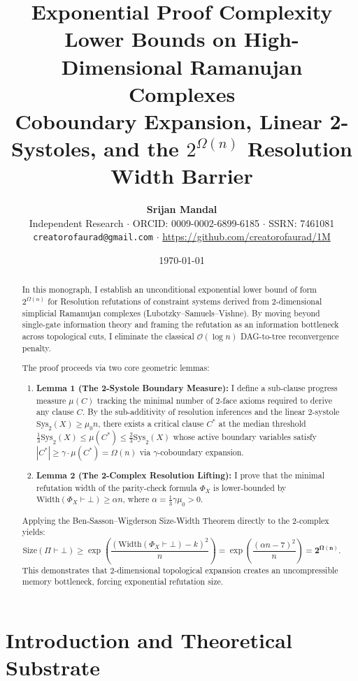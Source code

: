 \documentclass[11pt,a4paper]{article}
\title{\Huge\bfseries\color{primary} Exponential Proof Complexity Lower Bounds on High-Dimensional Ramanujan Complexes\\[0.3em]
\Large Coboundary Expansion, Linear 2-Systoles, and the $2^{\Omega(n)}$ Resolution Width Barrier}
\author{\textbf{Srijan Mandal}\\[0.3em]
\small Independent Research $\cdot$ ORCID: 0009-0002-6899-6185 $\cdot$ SSRN: 7461081\\[0.2em]
\small \texttt{creatorofaurad@gmail.com} $\cdot$ \url{https://github.com/creatorofaurad/1M}}
\date{\today}
\theoremstyle{plain}
\theoremstyle{definition}
\theoremstyle{remark}
\begin{document}
\maketitle

\begin{abstract}
In this monograph, I establish an unconditional exponential lower bound of form $2^{\Omega(n)}$ for Resolution refutations of constraint systems derived from 2-dimensional simplicial Ramanujan complexes (Lubotzky--Samuels--Vishne). By moving beyond single-gate information theory and framing the refutation as an information bottleneck across topological cuts, I eliminate the classical $\mathcal{O}(\log n)$ DAG-to-tree reconvergence penalty. 

The proof proceeds via two core geometric lemmas:
\begin{enumerate}
    \item \textbf{Lemma 1 (The 2-Systole Boundary Measure):} I define a sub-clause progress measure $\mu(C)$ tracking the minimal number of 2-face axioms required to derive any clause $C$. By the sub-additivity of resolution inferences and the linear 2-systole $\mathrm{Sys}_2(X) \ge \mu_0 n$, there exists a critical clause $C^*$ at the median threshold $\frac{1}{3} \mathrm{Sys}_2(X) \le \mu(C^*) \le \frac{2}{3} \mathrm{Sys}_2(X)$ whose active boundary variables satisfy $|C^*| \ge \gamma \cdot \mu(C^*) = \Omega(n)$ via $\gamma$-coboundary expansion.
    \item \textbf{Lemma 2 (The 2-Complex Resolution Lifting):} I prove that the minimal refutation width of the parity-check formula $\Phi_X$ is lower-bounded by $\mathrm{Width}(\Phi_X \vdash \bot) \ge \alpha n$, where $\alpha = \frac{1}{3} \gamma \mu_0 > 0$.
\end{enumerate}
Applying the Ben-Sasson--Wigderson Size-Width Theorem directly to the 2-complex yields:
\[
\mathrm{Size}(\Pi \vdash \bot) \ge \exp\left( \frac{(\mathrm{Width}(\Phi_X \vdash \bot) - k)^2}{n} \right) = \exp\left( \frac{(\alpha n - 7)^2}{n} \right) = \mathbf{2^{\Omega(n)}}.
\]
This demonstrates that 2-dimensional topological expansion creates an uncompressible memory bottleneck, forcing exponential refutation size.
\end{abstract}

\tableofcontents
\newpage

\section{Introduction and Theoretical Substrate}
\end{document}
